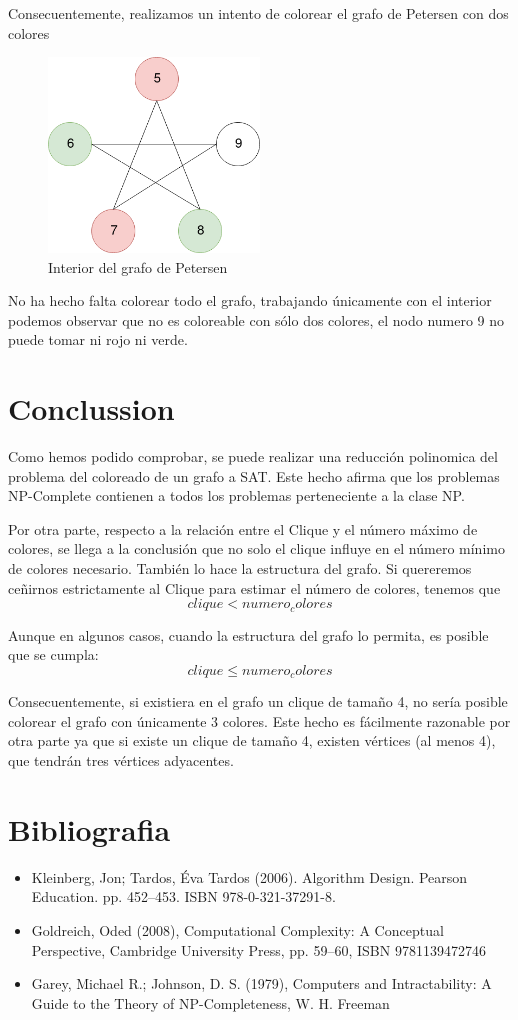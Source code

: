 \documentclass{article}
\begin{document}
Consecuentemente, realizamos un intento de colorear el grafo de Petersen con dos colores 
\begin{figure}[H]
    \centering
    \includegraphics[width=0.5\textwidth]{pictures/interior.png}
    \caption{Interior del grafo de Petersen}
\end{figure}

No ha hecho falta colorear todo el grafo, trabajando únicamente con el interior podemos observar que no es coloreable con sólo dos colores, el nodo
numero 9 no puede tomar ni rojo ni verde.   


\section{Conclussion}
Como hemos podido comprobar, se puede realizar una reducción polinomica del problema del coloreado de un grafo a SAT. Este hecho afirma
que los problemas NP-Complete contienen a todos los problemas perteneciente a la clase NP.

Por otra parte, respecto a la relación entre el Clique y el número máximo de colores, se llega a la conclusión que no solo el clique influye en 
el número mínimo de colores necesario. También lo hace la estructura del grafo. Si quereremos ceñirnos estrictamente al Clique 
para estimar el número de colores, tenemos que 
    \[clique < numero_colores \] 

Aunque en algunos casos, cuando la estructura del grafo lo permita, es posible que se cumpla: 
    \[clique \leq numero_colores\]

Consecuentemente, si existiera en el grafo un clique de tamaño 4, no sería posible colorear el grafo con únicamente 3 colores. Este hecho es 
fácilmente razonable por otra parte ya que si existe un clique de tamaño 4, existen vértices (al menos 4), que tendrán tres vértices adyacentes.

\section{Bibliografia}
\begin{itemize}
    \item Kleinberg, Jon; Tardos, Éva Tardos (2006). Algorithm Design. Pearson Education. pp. 452–453. ISBN 978-0-321-37291-8.
    \item Goldreich, Oded (2008), Computational Complexity: A Conceptual Perspective, Cambridge University Press, pp. 59–60, ISBN 9781139472746
    \item  Garey, Michael R.; Johnson, D. S. (1979), Computers and Intractability: A Guide to the Theory of NP-Completeness, W. H. Freeman
\end{itemize} 
\end{document}
